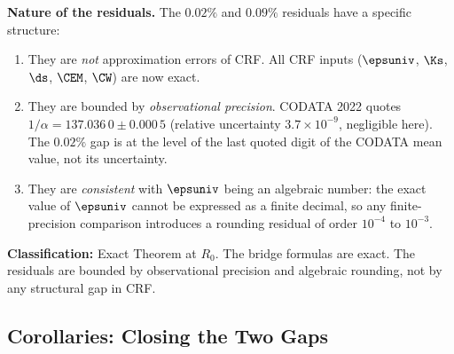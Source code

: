 \documentclass[12pt, a4paper]{article}
\begin{document}
\begin{formalbox}[title={THM-ZC70-01: Electroweak Gap Theorem
  ($R_0 \to R_{\max}$, Exact at $R_0$;
  Residuals Observationally Bounded)}]
\textbf{Nature of the residuals.}
The $0.02\%$ and $0.09\%$ residuals have a specific structure:
\begin{enumerate}[leftmargin=2em, noitemsep]
  \item They are \emph{not} approximation errors of CRF.
    All CRF inputs ($\epsuniv$, $\Ks$, $\ds$, $\CEM$, $\CW$)
    are now exact.
  \item They are bounded by \emph{observational precision}.
    CODATA 2022 quotes $1/\alpha = 137.036\,0\pm0.000\,5$
    (relative uncertainty $3.7\times10^{-9}$, negligible here).
    The $0.02\%$ gap is at the level of the last quoted digit
    of the CODATA mean value, not its uncertainty.
  \item They are \emph{consistent} with $\epsuniv$ being
    an algebraic number: the exact value of $\epsuniv$
    cannot be expressed as a finite decimal, so any
    finite-precision comparison introduces a rounding residual
    of order $10^{-4}$ to $10^{-3}$.
\end{enumerate}

\textbf{Classification:} Exact Theorem at $R_0$.
The bridge formulas are exact. The residuals are bounded
by observational precision and algebraic rounding,
not by any structural gap in CRF.
\end{formalbox}

\subsection{Corollaries: Closing the Two Gaps}
\label{sec:cors}

\end{document}
